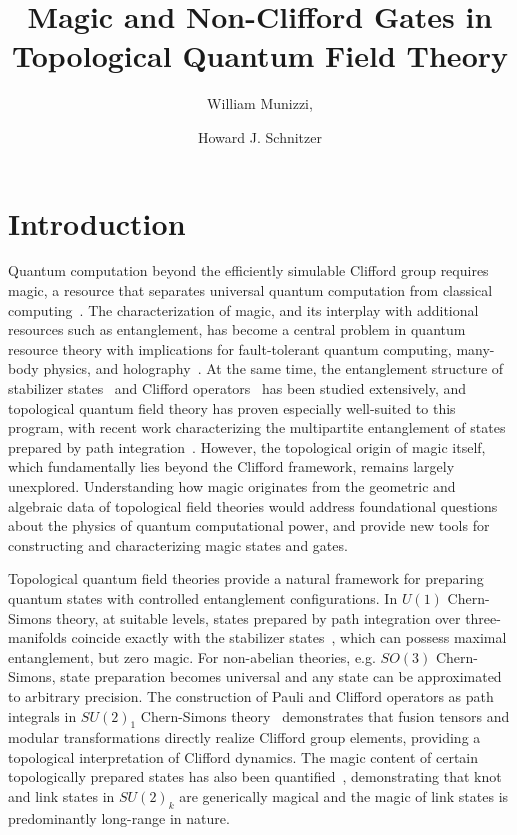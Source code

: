 \documentclass[12pt,a4paper]{article}
\title{Magic and Non-Clifford Gates in Topological Quantum Field Theory}
\author[a]{William Munizzi,}
\author[b]{Howard J. Schnitzer}
\affiliation[a]{Division of Physical Sciences, College of Letters and Science, University of California, Los Angeles, Los Angeles, CA, 90095, USA}
\affiliation[b]{Martin Fisher School of Physics, Brandeis University, Waltham, MA 02453, USA}
\begin{document}
\maketitle
\flushbottom


\section{Introduction}


Quantum computation beyond the efficiently simulable Clifford group requires magic, a resource that separates universal quantum computation from classical computing~\cite{Gottesman1997,Veitch2013,Bravyi2004,Howard2014,Bravyi2016,Campbell2012,Campbell2017}. The characterization of magic, and its interplay with additional resources such as entanglement, has become a central problem in quantum resource theory with implications for fault-tolerant quantum computing, many-body physics, and holography~\cite{Leone:2021rzd,Cao:2024nrx,tirrito:2024,haug:2025,faidon:2026,Bao:2022mkc}. At the same time, the entanglement structure of stabilizer states~\cite{garcia2017geometry,Linden:2013kal,Bao2020,Keeler:2022ajf,Keeler:2023xcx,Varikuti:2025poy,Nezami:2016zni,Fuentes:2025kwg} and Clifford operators~\cite{Keeler:2023shl,Munizzi:2023ihc,Munizzi:2024huw,CuiGottesmanKrishna2017,Farinholt_2014,Selinger2013,Jagannathan:2010sb} has been studied extensively, and topological quantum field theory has proven especially well-suited to this program, with recent work characterizing the multipartite entanglement of states prepared by path integration~\cite{Salton:2016qpp,Bao2022a,Balasubramanian:2025kaf,Cummings:2025zfe,Munizzi:2025suf}. However, the topological origin of magic itself, which fundamentally lies beyond the Clifford framework, remains largely unexplored. Understanding how magic originates from the geometric and algebraic data of topological field theories would address foundational questions about the physics of quantum computational power, and provide new tools for constructing and characterizing magic states and gates.

Topological quantum field theories provide a natural framework for preparing quantum states with controlled entanglement configurations. In $U(1)$ Chern-Simons theory, at suitable levels, states prepared by path integration over three-manifolds coincide exactly with the stabilizer states~\cite{Salton:2016qpp}, which can possess maximal entanglement, but zero magic. For non-abelian theories, e.g. $SO(3)$ Chern-Simons, state preparation becomes universal and any state can be approximated to arbitrary precision. The construction of Pauli and Clifford operators as path integrals in $SU(2)_1$ Chern-Simons theory~\cite{Schnitzer:2020tiv,Munizzi:2025suf} demonstrates that fusion tensors and modular transformations directly realize Clifford group elements, providing a topological interpretation of Clifford dynamics. The magic content of certain topologically prepared states has also been quantified~\cite{Fliss:2021}, demonstrating that knot and link states in $SU(2)_k$ are generically magical and the magic of link states is predominantly long-range in nature.
\end{document}
